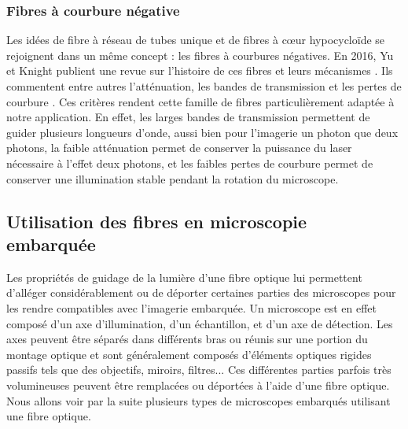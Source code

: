 \subsubsection{Fibres à courbure négative}

Les idées de fibre à réseau de tubes unique et de fibres à cœur hypocycloïde se rejoignent dans un même concept : les fibres à courbures négatives. En 2016, Yu et Knight publient une revue sur l'histoire de ces fibres et leurs mécanismes \cite{yu_negative_2016}. Ils commentent entre autres l'atténuation, les bandes de transmission et les pertes de courbure \cite{belardi_effect_2013}. Ces critères rendent cette famille de fibres particulièrement adaptée à notre application. En effet, les larges bandes de transmission permettent de guider plusieurs longueurs d'onde, aussi bien pour l'imagerie un photon que deux photons, la faible atténuation permet de conserver la puissance du laser nécessaire à l'effet deux photons, et les faibles pertes de courbure permet de conserver une illumination stable pendant la rotation du microscope.




\subsection{Utilisation des fibres en microscopie embarquée}


Les propriétés de guidage de la lumière d'une fibre optique lui permettent d'alléger considérablement ou de déporter certaines parties des microscopes pour les rendre compatibles avec l'imagerie embarquée. Un microscope est en effet composé d'un axe d'illumination, d'un échantillon, et d'un axe de détection. Les axes peuvent être séparés dans différents bras ou réunis sur une portion du montage optique et sont généralement composés d'éléments optiques rigides passifs tels que des objectifs, miroirs, filtres... Ces différentes parties parfois très volumineuses peuvent être remplacées ou déportées à l'aide d'une fibre optique. Nous allons voir par la suite plusieurs types de microscopes embarqués utilisant une fibre optique.

